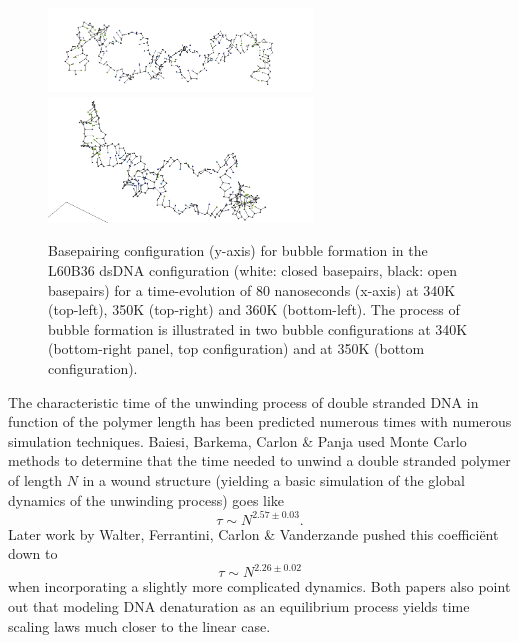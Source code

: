 \begin{figure}[hbt] \begin{minipage}{7cm}
 \end{minipage} \begin{minipage}{7cm}  \end{minipage}
\begin{minipage}{8cm}
 \end{minipage} \begin{minipage}{6cm}
\includegraphics[width=7cm]{images/L60B36_bubble2.png}\\
\includegraphics[width=7cm]{images/L60B36_bubble1.png} \end{minipage}
\begin{center}
\caption{Basepairing configuration (y-axis) for bubble formation in the L60B36 dsDNA configuration (white: closed basepairs, black: open basepairs) for a time-evolution of 80 nanoseconds (x-axis) at 340K (top-left), 350K (top-right) and 360K (bottom-left). The process of bubble formation is illustrated in two bubble configurations at 340K (bottom-right panel, top configuration) and at 350K (bottom configuration). }\label{L60B36_configs}
\end{center}
\end{figure}

The characteristic time of the unwinding process of double stranded DNA in function of the polymer length has been predicted numerous times with numerous simulation techniques. Baiesi, Barkema, Carlon \& Panja \cite{carlon2010unwinding} used Monte Carlo methods to determine that the time needed to unwind a double stranded polymer of length $N$ in a wound structure (yielding a basic simulation of the global dynamics of the unwinding process) goes like
\begin{equation}
\tau \sim N^{2.57\pm 0.03}.
\end{equation}
Later work by Walter, Ferrantini, Carlon \& Vanderzande \cite{walter2011fractional} pushed this coeffici\"ent down to 
\begin{equation}
\tau \sim N^{2.26 \pm 0.02}
\end{equation}
when incorporating a slightly more complicated dynamics. Both papers also point out that modeling DNA denaturation as an equilibrium process yields time scaling laws much closer to the linear case.

